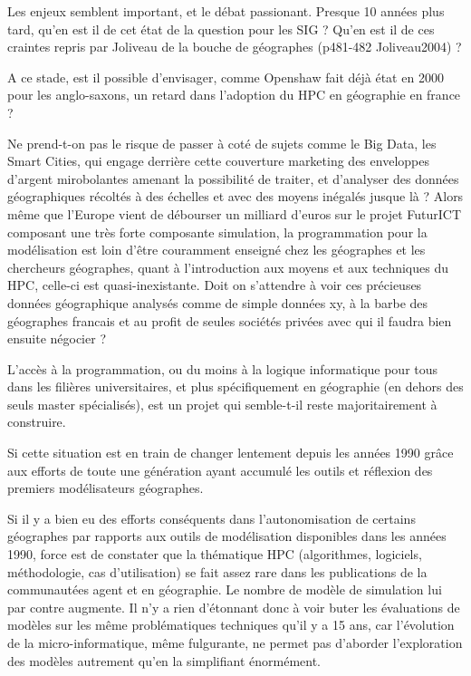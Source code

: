 Les enjeux semblent important, et le débat passionant. Presque 10 années plus tard, qu'en est il de cet état de la question pour les SIG ? Qu'en est il de ces   craintes repris par Joliveau de la bouche de géographes (p481-482 Joliveau2004) ?

A ce stade, est il possible d'envisager, comme Openshaw fait déjà état en 2000 pour les anglo-saxons, un retard dans l'adoption du HPC en géographie en france ?

Ne prend-t-on pas le risque de passer à coté de sujets comme le Big Data, les Smart Cities, qui engage derrière cette couverture marketing des enveloppes d'argent mirobolantes amenant la possibilité de traiter, et d’analyser des données géographiques récoltés à des échelles et avec des moyens inégalés jusque là ? Alors même que l’Europe vient de débourser un milliard d’euros sur le projet FuturICT composant une très forte composante simulation, la programmation pour la modélisation est loin d’être couramment enseigné chez les géographes et les chercheurs géographes, quant à l'introduction aux moyens et aux techniques du HPC, celle-ci est quasi-inexistante. Doit on s’attendre à voir ces précieuses données géographique analysés comme de simple données xy, à la barbe des géographes francais et au profit de seules sociétés privées avec qui il faudra bien ensuite négocier ?

L'accès à la programmation, ou du moins à la logique informatique pour tous dans les filières universitaires, et plus spécifiquement en géographie (en dehors des seuls master spécialisés), est un projet qui semble-t-il reste majoritairement à construire.

Si cette situation est en train de changer lentement depuis les années 1990 grâce aux efforts de toute une génération ayant accumulé les outils et réflexion des premiers modélisateurs géographes.

















Si il y a bien eu des efforts conséquents dans l'autonomisation de certains géographes par rapports aux outils de modélisation disponibles dans les années 1990, force est de constater que la thématique HPC (algorithmes, logiciels, méthodologie, cas d'utilisation) se fait assez rare dans les publications de la communautées agent et en géographie. Le nombre de modèle de simulation lui par contre augmente. Il n'y a rien d'étonnant donc à voir buter les évaluations de modèles sur les même problématiques techniques qu'il y a 15 ans, car l'évolution de la micro-informatique, même fulgurante, ne permet pas d'aborder l'exploration des modèles autrement qu'en la simplifiant énormément.


